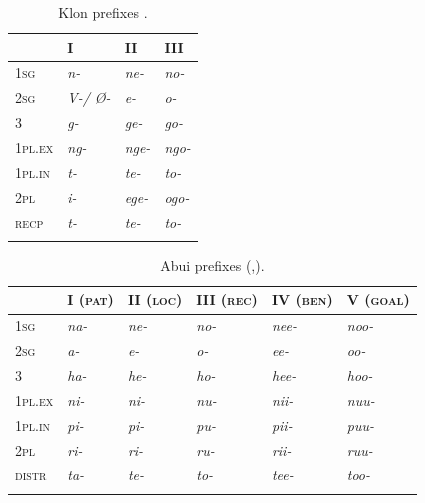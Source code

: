 \begin{table}\centering
\begin{tabular}{llll} 
\mytoprule
& I & II & III\\
\midrule
1\textsc{sg} & {\itshape n-} & {\itshape ne-} & {\itshape no-}\\
2\textsc{sg} & {\itshape V-/ {\O}-} & {\itshape e-} & {\itshape o-}\\
3 & {\itshape g-} & {\itshape ge-} & {\itshape go-}\\
{\scshape 1pl.ex} & {\itshape ng-} & {\itshape nge-} & {\itshape ngo-}\\
{\scshape 1pl.in} & {\itshape t-} & {\itshape te-} & {\itshape to-}\\
{\scshape 2pl} & {\itshape i-} & {\itshape ege-} & {\itshape ogo-}\\
{\scshape recp} & {\itshape t-} & {\itshape te-} & {\itshape to-}\\
\mybottomrule
\end{tabular}
\caption{Klon prefixes \citep[69,39]{Baird2008}.}
\label{tab:1:5}
\end{table}

 


\begin{table}\centering 
\begin{tabular}{llllll}
\mytoprule
 & {\scshape I (pat)} & {\scshape II (loc)} & {\scshape III (rec)} & {\scshape IV (ben)} & {\scshape V (goal)}\\
\midrule 
1\textsc{sg} & {\itshape na-} & {\itshape ne-} & {\itshape no-} & {\itshape nee-} & {\itshape noo-}\\
2\textsc{sg} & {\itshape a-} & {\itshape e-} & {\itshape o-} & {\itshape ee-} & {\itshape oo-}\\
3 & {\itshape ha-} & {\itshape he-} & {\itshape ho-} & {\itshape hee-} & {\itshape hoo-}\\
{\scshape 1pl.ex} & {\itshape ni-} & {\itshape ni-} & {\itshape nu-} & {\itshape nii-} & {\itshape nuu-}\\
{\scshape 1pl.in} & {\itshape pi-} & {\itshape pi-} & {\itshape pu-} & {\itshape pii-} & {\itshape puu-}\\
{\scshape 2pl} & {\itshape ri-} & {\itshape ri-} & {\itshape ru-} & {\itshape rii-} & {\itshape ruu-}\\
{\scshape distr} & {\itshape ta-} & {\itshape te-} & {\itshape to-} & {\itshape tee-} & {\itshape too-}\\
\mybottomrule
\end{tabular}

\caption{Abui prefixes (\citealt[78]{Kratochvil2007},\citealt[591]{Kratochvil2011transitivity}).}
\label{tab:1:6}
\end{table}

